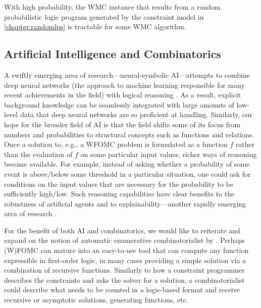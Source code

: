 \begin{conjecture}
  With high probability, the WMC instance that results from a random
  probabilistic logic program generated by the constraint model in
  \cref{chapter:randomlps} is tractable for some WMC algorithm.
\end{conjecture}


\subsection{Artificial Intelligence and Combinatorics}

A swiftly emerging area of research---neural-symbolic AI---attempts to combine
deep neural networks (the approach to machine learning responsible for many
recent achievements in the field) with logical reasoning
\citep{DBLP:conf/ijcai/RaedtDMM20,garnelo2019reconciling,DBLP:series/faia/342}.
As a result, explicit background knowledge can be seamlessly integrated with
large amounts of low-level data that deep neural networks are so proficient at
handling. Similarly, our hope for the broader field of AI is that the field
shifts some of its focus from numbers and probabilities to structural concepts
such as functions and relations. Once a solution to, e.g., a WFOMC problem is
formulated as a function $f$ rather than the evaluation of $f$ on some
particular input values, richer ways of reasoning become available. For example,
instead of asking whether a probability of some event is above/below some
threshold in a particular situation, one could ask for conditions on the input
values that are necessary for the probability to be sufficiently high/low. Such
reasoning capabilities have clear benefits to the robustness of artificial
agents and to explainability---another rapidly emerging area of research
\citep{DBLP:journals/corr/abs-1909-03012,DBLP:journals/fdata/BelleP21,DBLP:journals/corr/abs-2202-10335}.

For the benefit of both AI and combinatorics, we would like to reiterate and
expand on the notion of automatic enumerative combinatorialist by
\citet{DBLP:conf/ilp/BarvinekB0ZK21}. Perhaps (W)FOMC can mature into an
easy-to-use tool that can compute any function expressible in first-order logic,
in many cases providing a simple solution via a combination of recursive
functions. Similarly to how a constraint programmer describes the constraints
and asks the solver for a solution, a combinatorialist could describe what needs
to be counted in a logic-based format and receive recursive or asymptotic
solutions, generating functions, etc.

